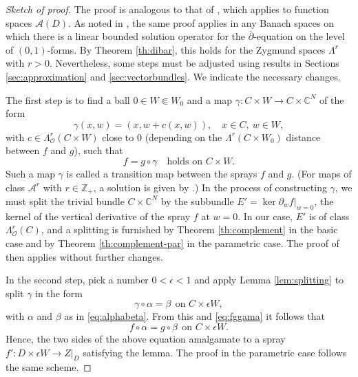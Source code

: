 \documentclass[11pt]{amsart}
\numberwithin{equation}{section}
\theoremstyle{definition}
\newcommand\Ascr{\mathscr{A}}
\newcommand\Oscr{\mathscr{O}}
\newcommand\C{\mathbb{C}}
\newcommand\Z{\mathbb{Z}}
\newcommand\di{\partial}
\newcommand\dibar{\overline\partial}
\begin{document}
\begin{proof}[Sketch of proof]
The proof is analogous to that of 
\cite[Proposition 5.9.2, p.\ 240]{Forstneric2017E},
which applies to function spaces $\Ascr(D)$.
As noted in \cite[Remark 5.8.3 (B), p.\ 238]{Forstneric2017E},
the same proof applies in any Banach spaces on which there is a
linear bounded solution operator for the $\dibar$-equation 
on the level of $(0,1)$-forms. By Theorem \ref{th:dibar}, 
this holds for the Zygmund spaces $\Lambda^r$ with $r>0$. 
Nevertheless, some steps must be adjusted using results in  
Sections \ref{sec:approximation} and \ref{sec:vectorbundles}.
We indicate the necessary changes. 

The first step is to find a ball $0\in W\Subset W_0$ and a map 
$\gamma:C\times W\to C\times \C^N$ of the form 
\[ 
	\gamma(x,w) = (x,w + c(x,w)), \quad x\in C,\ w\in W,
\] 
with $c\in \Lambda^r_\Oscr(C\times W)$ close to $0$
(depending on the $\Lambda^r(C\times W_0)$ distance 
between $f$ and $g$), such that 
\begin{equation}\label{eq:fggama} 
	 f = g\circ \gamma \quad \text{holds on $C \times W$}.
\end{equation}
Such a map $\gamma$ is called a transition map between the sprays $f$ and $g$. 
(For maps of class $\Ascr^r$ with $r\in \Z_+$, 
a solution is given by \cite[Lemma 5.9.3, p.\ 240]{Forstneric2017E}.)  
In the process of constructing $\gamma$, 
we must split the trivial bundle $C\times \C^N$
by the subbundle $E'=\ker \di_w f|_{w=0}$,
the kernel of the vertical derivative of the spray $f$ at $w=0$. 
In our case, $E'$ is of class $\Lambda^r_\Oscr(C)$, 
and a splitting is furnished by Theorem \ref{th:complement} in the 
basic case and by Theorem \ref{th:complement-par} in the parametric case. 
The proof of \cite[Lemma 5.9.3]{Forstneric2017E} 
then applies without further changes. 

In the second step, pick a number $0<\epsilon<1$
and apply Lemma \ref{lem:splitting} to split $\gamma$ in the form 
\[
   \gamma\circ\alpha = \beta
   \ \ \text{on $C\times \epsilon W$},
\]
with $\alpha$ and $\beta$ as in \eqref{eq:alphabeta}. 
From this and \eqref{eq:fggama} it follows that 
\begin{equation}\label{eq:falphagbeta}
	f\circ \alpha = g\circ \beta \ \ \text{on $C\times \epsilon W$}.
\end{equation}
Hence, the two sides of the above equation amalgamate 
to a spray $f':D\times \epsilon W\to Z|_D$ satisfying the lemma. 
The proof in the parametric case follows the same scheme.
\end{proof}
\end{document}
